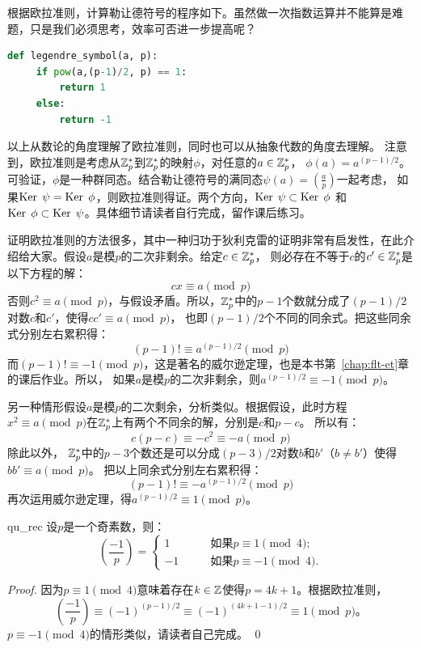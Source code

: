  根据欧拉准则，计算勒让德符号的程序如下。虽然做一次指数运算并不能算是难题，只是我们必须思考，效率可否进一步提高呢？
 \begin{lstlisting}[language=Python]
 def legendre_symbol(a, p):
     if pow(a,(p-1)/2, p) == 1:
         return 1
     else:
         return -1
 \end{lstlisting}
 
以上从数论的角度理解了欧拉准则，同时也可以从抽象代数的角度去理解。
注意到，欧拉准则是考虑从${\mathbb Z}_p^*$到${\mathbb Z}_p^*$的映射$\phi$，对任意的$a \in {\mathbb Z}_p^*$，
$\phi(a) = a^{(p-1)/2}$。可验证，$\phi$是一种群同态。结合勒让德符号的满同态$\psi(a) =  \left(\frac{a}{p}\right)$一起考虑，
如果$\operatorname{Ker}\; \psi = \operatorname{Ker}\; \phi$，则欧拉准则得证。两个方向，$\operatorname{Ker}\; \psi \subset \operatorname{Ker}\; \phi$
和$\operatorname{Ker}\; \phi \subset \operatorname{Ker}\; \psi$。具体细节请读者自行完成，留作课后练习。

证明欧拉准则的方法很多，其中一种归功于狄利克雷的证明非常有启发性，在此介绍给大家。假设$a$是模$p$的二次非剩余。给定$c \in {\mathbb Z}_p^*$，
则必存在不等于$c$的$c' \in {\mathbb Z}_p^*$是以下方程的解：
\[ c x \equiv a \pmod{p}\]
否则$c^2 \equiv a \pmod{p}$，与假设矛盾。所以，${\mathbb Z}_{p}^*$中的$p-1$个数就分成了$(p-1)/2$对数$c$和$c'$，使得$c c' \equiv a \pmod{p}$，
也即$(p - 1)/2$个不同的同余式。把这些同余式分别左右累积得：
\[ (p - 1)! \equiv a^{(p - 1)/2} \pmod{p}\]
而$(p - 1)!  \equiv -1 \pmod{p}$，这是著名的威尔逊定理，也是本书第~\ref{chap:flt-et}章的课后作业。所以，
如果$a$是模$p$的二次非剩余，则$a^{(p-1)/2} \equiv -1 \pmod{p}$。

另一种情形假设$a$是模$p$的二次剩余，分析类似。根据假设，此时方程$x^2 \equiv a  \pmod{p}$在${\mathbb Z}_{p}^*$上有两个不同余的解，分别是$c$和$p-c$。
所以有：
\[c (p - c)  \equiv -c^2 \equiv  -a \pmod{p}\]
除此以外， ${\mathbb Z}_p^*$中的$p - 3$个数还是可以分成$(p - 3)/2$对数$b$和$b'$（$b \neq b'$）使得$b b' \equiv a \pmod{p}$。
把以上同余式分别左右累积得：
\[ (p-1)! \equiv - a^{(p-1)/2} \pmod{p}\]
再次运用威尔逊定理，得$a^{(p-1)/2} \equiv 1 \pmod{p}$。

  \begin{corollary}{}{qu_rec}
  设$p$是一个奇素数，则：
 \[
   \left(\frac{-1}{p}\right) = 
    \begin{cases}
    1 & \qquad \text{如果} p \equiv 1 \pmod{4};\\
    -1 & \qquad \text{如果} p \equiv -1 \pmod{4}.
    \end{cases}
  \]
  \end{corollary}
 
  \begin{proof}
  因为$p \equiv 1 \pmod{4}$意味着存在$k\in {\mathbb Z}$使得$p = 4k +1$。根据欧拉准则，
  \[\left(\frac{-1}{p}\right) \equiv  (-1)^{(p-1)/2} \equiv (-1)^{(4k + 1 - 1)/2} \equiv 1 \pmod{p} \text{。}\]
  $p \equiv -1 \pmod{4}$的情形类似，请读者自己完成。
  \qed
  \end{proof}
  
